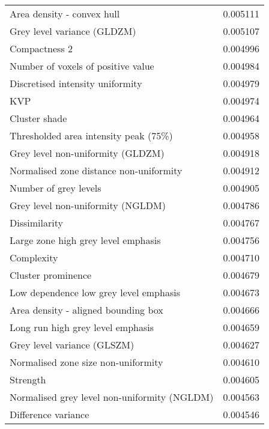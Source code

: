 \begin{longtable}{|lr|}
Area density - convex hull                         &        0.005111 \\
Grey level variance (GLDZM)                        &        0.005107 \\
Compactness 2                                      &        0.004996 \\
Number of voxels of positive value                 &        0.004984 \\
Discretised intensity uniformity                   &        0.004979 \\
KVP                                                &        0.004974 \\
Cluster shade                                      &        0.004964 \\
Thresholded area intensity peak (75\%)              &        0.004958 \\
Grey level non-uniformity (GLDZM)                  &        0.004918 \\
Normalised zone distance non-uniformity            &        0.004912 \\
Number of grey levels                              &        0.004905 \\
Grey level non-uniformity (NGLDM)                  &        0.004786 \\
Dissimilarity                                      &        0.004767 \\
Large zone high grey level emphasis                &        0.004756 \\
Complexity                                         &        0.004710 \\
Cluster prominence                                 &        0.004679 \\
Low dependence low grey level emphasis             &        0.004673 \\
Area density - aligned bounding box                &        0.004666 \\
Long run high grey level emphasis                  &        0.004659 \\
Grey level variance (GLSZM)                        &        0.004627 \\
Normalised zone size non-uniformity                &        0.004610 \\
Strength                                           &        0.004605 \\
Normalised grey level non-uniformity (NGLDM)       &        0.004563 \\
Difference variance                                &        0.004546 \\

\end{longtable}
